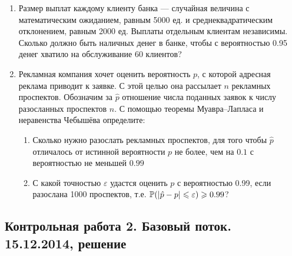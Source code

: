 \documentclass[12pt, a4paper]{article}\usepackage[]{graphicx}\usepackage[]{color}
\begin{document}
\begin{enumerate}
\item Размер выплат каждому клиенту банка — случайная величина с математическим
ожиданием, равным 5000 ед. и среднеквадратическим отклонением, равным 2000 ед.
Выплаты отдельным клиентам независимы. Сколько должно быть наличных денег в банке,
чтобы с вероятностью 0.95 денег хватило на обслуживание 60 клиентов?

\item Рекламная компания хочет оценить вероятность $p$, с которой адресная реклама приводит к
заявке. С этой целью она  рассылает $n$ рекламных проспектов. Обозначим за $\hat p$ отношение
числа поданных заявок к числу разосланных проспектов $n$. С помощью теоремы Муавра–Лапласа и неравенства Чебышёва определите:
\begin{enumerate}
\item  Сколько нужно разослать рекламных проспектов, для того чтобы $\hat p$ отличалось от
истинной вероятности $p$ не более, чем на $0.1$ с вероятностью не меньшей $0.99$
\item С какой точностью $\varepsilon$ удастся оценить $p$ с вероятностью 0.99, если разослана 1000
проспектов, т.е. $\P(|\hat p - p|\leq \varepsilon)\geq 0.99$?
\end{enumerate}
\end{enumerate}





\subsection{Контрольная работа 2. Базовый поток. 15.12.2014, решение}
\end{document}
